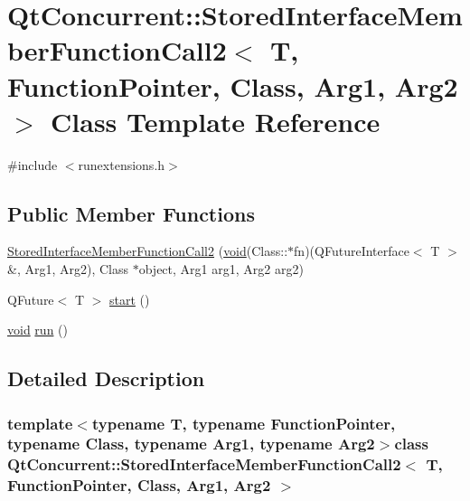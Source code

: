 \hypertarget{class_qt_concurrent_1_1_stored_interface_member_function_call2}{\section{\-Qt\-Concurrent\-:\-:\-Stored\-Interface\-Member\-Function\-Call2$<$ \-T, \-Function\-Pointer, \-Class, \-Arg1, \-Arg2 $>$ \-Class \-Template \-Reference}
\label{class_qt_concurrent_1_1_stored_interface_member_function_call2}
}


{\ttfamily \#include $<$runextensions.\-h$>$}

\subsection*{\-Public \-Member \-Functions}
\begin{DoxyCompactItemize}
\item 
\hyperlink{class_qt_concurrent_1_1_stored_interface_member_function_call2_ae0db07ecfaf6ceb0927ed7d8431a8fb0}{\-Stored\-Interface\-Member\-Function\-Call2} (\hyperlink{group___u_a_v_objects_plugin_ga444cf2ff3f0ecbe028adce838d373f5c}{void}(\-Class\-::$\ast$fn)(\-Q\-Future\-Interface$<$ \-T $>$ \&, \-Arg1, \-Arg2), \-Class $\ast$object, \-Arg1 arg1, \-Arg2 arg2)
\item 
\-Q\-Future$<$ \-T $>$ \hyperlink{class_qt_concurrent_1_1_stored_interface_member_function_call2_aa58d14bf98831702bbae8ffef074ce24}{start} ()
\item 
\hyperlink{group___u_a_v_objects_plugin_ga444cf2ff3f0ecbe028adce838d373f5c}{void} \hyperlink{class_qt_concurrent_1_1_stored_interface_member_function_call2_a9fafd67c59b5dc245ef8ad4ade32c7d3}{run} ()
\end{DoxyCompactItemize}


\subsection{\-Detailed \-Description}
\subsubsection*{template$<$typename T, typename Function\-Pointer, typename Class, typename Arg1, typename Arg2$>$class Qt\-Concurrent\-::\-Stored\-Interface\-Member\-Function\-Call2$<$ T, Function\-Pointer, Class, Arg1, Arg2 $>$}



